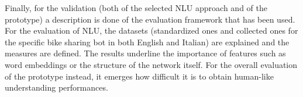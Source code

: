 Finally, for the validation (both of the selected NLU approach and of the prototype) a description is done of the evaluation framework that has been used. For the evaluation of NLU, the datasets (standardized ones and collected ones for the specific bike sharing bot in both English and Italian) are explained and the measures are defined. The results underline the importance of features such as word embeddings or the structure of the network itself. For the overall evaluation of the prototype instead, it emerges how difficult it is to obtain human-like understanding performances.
